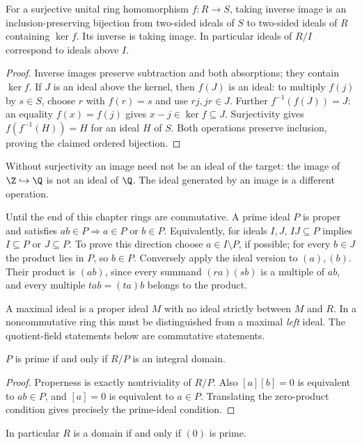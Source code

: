 \begin{theorem}\label{thm:ideal-correspondence}
For a surjective unital ring homomorphism $f:R\to S$, taking inverse
image is an inclusion-preserving bijection from two-sided ideals of $S$
to two-sided ideals of $R$ containing $\ker f$. Its inverse is taking
image. In particular ideals of $R/I$ correspond to ideals above $I$.
\end{theorem}
\begin{proof}
Inverse images preserve subtraction and both absorptions; they contain
$\ker f$. If $J$ is an ideal above the kernel, then $f(J)$ is an ideal:
to multiply $f(j)$ by $s\in S$, choose $r$ with $f(r)=s$ and use
$rj,jr\in J$. Further $f^{-1}(f(J))=J$: an equality $f(x)=f(j)$
gives $x-j\in\ker f\subseteq J$. Surjectivity gives
$f(f^{-1}(H))=H$ for an ideal $H$ of $S$.
Both operations preserve inclusion, proving the claimed ordered bijection.
\end{proof}
Without surjectivity an image need not be an ideal of the target:
the image of $\Z\hookrightarrow\Q$ is not an ideal of $\Q$.
The ideal generated by an image is a different operation.

Until the end of this chapter rings are commutative.
A prime ideal $P$ is proper and satisfies
$ab\in P\Rightarrow a\in P$ or $b\in P$.
Equivalently, for ideals $I,J$, $IJ\subseteq P$ implies
$I\subseteq P$ or $J\subseteq P$. To prove this direction choose
$a\in I\setminus P$, if possible; for every $b\in J$ the product lies
in $P$, so $b\in P$. Conversely apply the ideal version to $(a),(b)$.
Their product is $(ab)$, since every summand $(ra)(sb)$ is a multiple
of $ab$, and every multiple $t ab=(ta)b$ belongs to the product.

A maximal ideal is a proper ideal $M$ with no ideal strictly between
$M$ and $R$. In a noncommutative ring this must be distinguished from
a maximal \emph{left} ideal. The quotient-field statements below are
commutative statements.

\begin{proposition}\label{prop:prime-quotient}
$P$ is prime if and only if $R/P$ is an integral domain.
\end{proposition}
\begin{proof}
Properness is exactly nontriviality of $R/P$. Also
$[a][b]=0$ is equivalent to $ab\in P$, and $[a]=0$ is equivalent
to $a\in P$. Translating the zero-product condition gives precisely
the prime-ideal condition.
\end{proof}
In particular $R$ is a domain if and only if $(0)$ is prime.

